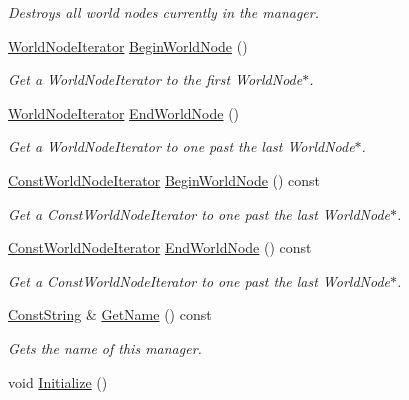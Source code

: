 \begin{DoxyCompactItemize}
\begin{DoxyCompactList}\small\item\em Destroys all world nodes currently in the manager. \item\end{DoxyCompactList}\item 
\hyperlink{classphys_1_1SceneManager_a67b62f6e9116423306b82e20cb2415fd}{WorldNodeIterator} \hyperlink{classphys_1_1SceneManager_a6fe8d95fd8989d93e0a47765dfa05049}{BeginWorldNode} ()
\begin{DoxyCompactList}\small\item\em Get a WorldNodeIterator to the first WorldNode$\ast$. \item\end{DoxyCompactList}\item 
\hyperlink{classphys_1_1SceneManager_a67b62f6e9116423306b82e20cb2415fd}{WorldNodeIterator} \hyperlink{classphys_1_1SceneManager_aeac64d80d1fcad273efb1c1a8ca2380c}{EndWorldNode} ()
\begin{DoxyCompactList}\small\item\em Get a WorldNodeIterator to one past the last WorldNode$\ast$. \item\end{DoxyCompactList}\item 
\hyperlink{classphys_1_1SceneManager_aa893eadb43492c0a4a9cafe2d150742c}{ConstWorldNodeIterator} \hyperlink{classphys_1_1SceneManager_abd11df0871af0e96b3ed7a5030cf43d2}{BeginWorldNode} () const 
\begin{DoxyCompactList}\small\item\em Get a ConstWorldNodeIterator to one past the last WorldNode$\ast$. \item\end{DoxyCompactList}\item 
\hyperlink{classphys_1_1SceneManager_aa893eadb43492c0a4a9cafe2d150742c}{ConstWorldNodeIterator} \hyperlink{classphys_1_1SceneManager_a78b89a81744dbc32b8723da55734c279}{EndWorldNode} () const 
\begin{DoxyCompactList}\small\item\em Get a ConstWorldNodeIterator to one past the last WorldNode$\ast$. \item\end{DoxyCompactList}\item 
\hyperlink{namespacephys_a5ce5049f8b4bf88d6413c47b504ebb31}{ConstString} \& \hyperlink{classphys_1_1SceneManager_a3f06260dffe9c70f17934cdfe41bd5a5}{GetName} () const 
\begin{DoxyCompactList}\small\item\em Gets the name of this manager. \item\end{DoxyCompactList}\item 
\hypertarget{classphys_1_1SceneManager_aa13b380a4e38f706a1977237fc4b165e}{
void \hyperlink{classphys_1_1SceneManager_aa13b380a4e38f706a1977237fc4b165e}{Initialize} ()}
\label{dd/da8/classphys_1_1SceneManager_aa13b380a4e38f706a1977237fc4b165e}


\end{DoxyCompactItemize}
